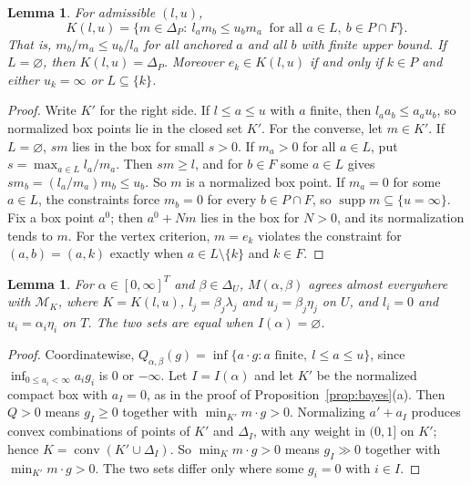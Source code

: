 \documentclass[11pt]{article}
\newtheorem{lemma}[theorem]{Lemma}
\theoremstyle{remark}\newtheorem{remark}[theorem]{Remark}
\newcommand{\M}{\mathcal M}
\newcommand{\supp}{\operatorname{supp}}
\newcommand{\conv}{\operatorname{conv}}
\begin{document}
\begin{lemma}\label{lem:intrinsic}
For admissible $(l,u)$,
\[
 K(l,u)=\{m\in\Delta_P:\ l_am_b\le u_bm_a\ \text{ for all }a\in L,\
 b\in P\cap F\}.
\]
That is, $m_b/m_a\le u_b/l_a$ for all anchored $a$ and all $b$ with
finite upper bound. If $L=\varnothing$, then $K(l,u)=\Delta_P$. Moreover
$e_k\in K(l,u)$ if and only if $k\in P$ and either $u_k=\infty$ or
$L\subseteq\{k\}$.
\end{lemma}
\begin{proof}
Write $K'$ for the right side. If $l\le a\le u$ with $a$ finite, then
$l_aa_b\le a_au_b$, so normalized box points lie in the closed set $K'$.
For the converse, let $m\in K'$. If $L=\varnothing$, $sm$ lies in the box
for small $s>0$. If $m_a>0$ for all $a\in L$, put $s=\max_{a\in L}l_a/m_a$.
Then $sm\ge l$, and for $b\in F$ some $a\in L$ gives
$sm_b=(l_a/m_a)m_b\le u_b$. So $m$ is a normalized box point. If $m_a=0$
for some $a\in L$, the constraints force $m_b=0$ for every $b\in P\cap F$,
so $\supp m\subseteq\{u=\infty\}$. Fix a box point $a^0$; then $a^0+Nm$
lies in the box for $N>0$, and its normalization tends to $m$. For the
vertex criterion, $m=e_k$ violates the constraint for $(a,b)=(a,k)$
exactly when $a\in L\setminus\{k\}$ and $k\in F$.
\end{proof}

\begin{lemma}\label{lem:credal}
For $\alpha\in[0,\infty]^T$ and $\beta\in\Delta_U$, $M(\alpha,\beta)$
agrees almost everywhere with $\M_K$, where $K=K(l,u)$, $l_j=\beta_j\lambda_j$
and $u_j=\beta_j\eta_j$ on $U$, and $l_i=0$ and $u_i=\alpha_i\eta_i$ on $T$.
The two sets are equal when $I(\alpha)=\varnothing$.
\end{lemma}
\begin{proof}
Coordinatewise, $Q_{\alpha,\beta}(g)=\inf\{a\cdot g:a\text{ finite},\
l\le a\le u\}$, since $\inf_{0\le a_i<\infty}a_ig_i$ is $0$ or $-\infty$.
Let $I=I(\alpha)$ and let $K'$ be the normalized compact box with
$a_I=0$, as in the proof of Proposition~\ref{prop:bayes}(a). Then $Q>0$
means $g_I\ge0$ together with $\min_{K'}m\cdot g>0$. Normalizing
$a'+a_I$ produces convex combinations of points of $K'$ and $\Delta_I$,
with any weight in $(0,1]$ on $K'$; hence $K=\conv(K'\cup\Delta_I)$. So
$\min_Km\cdot g>0$ means $g_I\gg0$ together with $\min_{K'}m\cdot g>0$.
The two sets differ only where some $g_i=0$ with $i\in I$.
\end{proof}
\end{document}
